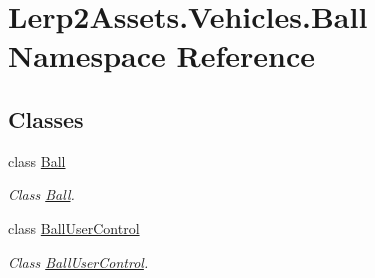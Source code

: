 \hypertarget{namespace_lerp2_assets_1_1_vehicles_1_1_ball}{}\section{Lerp2\+Assets.\+Vehicles.\+Ball Namespace Reference}
\label{namespace_lerp2_assets_1_1_vehicles_1_1_ball}
\subsection*{Classes}
\begin{DoxyCompactItemize}
\item 
class \hyperlink{class_lerp2_assets_1_1_vehicles_1_1_ball_1_1_ball}{Ball}
\begin{DoxyCompactList}\small\item\em Class \hyperlink{class_lerp2_assets_1_1_vehicles_1_1_ball_1_1_ball}{Ball}. \end{DoxyCompactList}\item 
class \hyperlink{class_lerp2_assets_1_1_vehicles_1_1_ball_1_1_ball_user_control}{Ball\+User\+Control}
\begin{DoxyCompactList}\small\item\em Class \hyperlink{class_lerp2_assets_1_1_vehicles_1_1_ball_1_1_ball_user_control}{Ball\+User\+Control}. \end{DoxyCompactList}\end{DoxyCompactItemize}
